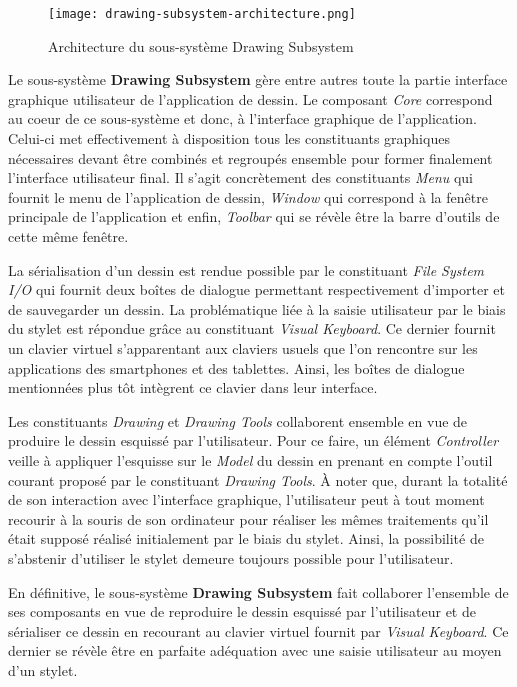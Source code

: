 \documentclass[11pt,a4paper,oldfontcommands]{memoir}
\begin{document}
\begin{figure}[H]
\centering
\texttt{[image: drawing-subsystem-architecture.png]}
\caption{Architecture du sous-système Drawing Subsystem}
\end{figure}

Le sous-système \textbf{Drawing Subsystem} gère entre autres toute la partie interface graphique utilisateur de l'application de dessin. Le composant \textit{Core} correspond au coeur de ce sous-système et donc, à l'interface graphique de l'application. Celui-ci met effectivement à disposition tous les constituants graphiques nécessaires devant être combinés et regroupés ensemble pour former finalement l'interface utilisateur final. Il s'agit concrètement des constituants \textit{Menu} qui fournit le menu de l'application de dessin, \textit{Window} qui correspond à la fenêtre principale de l'application et enfin, \textit{Toolbar} qui se révèle être la barre d'outils de cette même fenêtre.

La sérialisation d'un dessin est rendue possible par le constituant \textit{File System I/O} qui fournit deux boîtes de dialogue permettant respectivement d'importer et de sauvegarder un dessin. La problématique liée à la saisie utilisateur par le biais du stylet est répondue grâce au constituant \textit{Visual Keyboard}. Ce dernier fournit un clavier virtuel s'apparentant aux claviers usuels que l'on rencontre sur les applications des smartphones et des tablettes. Ainsi, les boîtes de dialogue mentionnées plus tôt intègrent ce clavier dans leur interface. 

Les constituants \textit{Drawing} et \textit{Drawing Tools} collaborent ensemble en vue de produire le dessin esquissé par l'utilisateur. Pour ce faire, un élément \textit{Controller} veille à appliquer l'esquisse sur le \textit{Model} du dessin en prenant en compte l'outil courant proposé par le constituant \textit{Drawing Tools}. À noter que, durant la totalité de son interaction avec l'interface graphique, l'utilisateur peut à tout moment recourir à la souris de son ordinateur pour réaliser les mêmes traitements qu'il était supposé réalisé initialement par le biais du stylet. Ainsi, la possibilité de s'abstenir d'utiliser le stylet demeure toujours possible pour l'utilisateur.

En définitive, le sous-système \textbf{Drawing Subsystem} fait collaborer l'ensemble de ses composants en vue de reproduire le dessin esquissé par l'utilisateur et de sérialiser ce dessin en recourant au clavier virtuel fournit par \textit{Visual Keyboard}. Ce dernier se révèle être en parfaite adéquation avec une saisie utilisateur au moyen d'un stylet.
\end{document}
